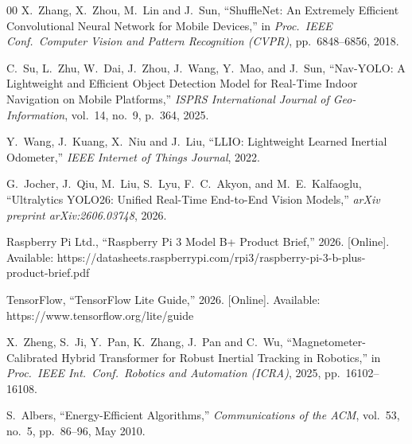 \documentclass[10pt,conference,letterpaper]{IEEEtran}
\begin{document}
\begin{thebibliography}{00}
X.\ Zhang, X.\ Zhou, M.\ Lin and J.\ Sun,
``ShuffleNet: An Extremely Efficient Convolutional Neural Network for
Mobile Devices,''
in \textit{Proc.\ IEEE Conf.\ Computer Vision and Pattern Recognition
(CVPR)}, pp.\ 6848--6856, 2018.


C.~Su, L.~Zhu, W.~Dai, J.~Zhou, J.~Wang, Y.~Mao, and J.~Sun,
``Nav-YOLO: A Lightweight and Efficient Object Detection Model for
Real-Time Indoor Navigation on Mobile Platforms,''
\textit{ISPRS International Journal of Geo-Information}, vol.~14,
no.~9, p.~364, 2025.

Y.~Wang, J.~Kuang, X.~Niu and J.~Liu,
``LLIO: Lightweight Learned Inertial Odometer,''
\textit{IEEE Internet of Things Journal}, 2022.


G.\ Jocher, J.\ Qiu, M.\ Liu, S.\ Lyu, F.\ C.\ Akyon, and M.\ E.\ Kalfaoglu,
``Ultralytics YOLO26: Unified Real-Time End-to-End Vision Models,''
\textit{arXiv preprint arXiv:2606.03748}, 2026.

Raspberry Pi Ltd.,
``Raspberry Pi 3 Model B+ Product Brief,'' 2026. [Online]. Available:
https://datasheets.raspberrypi.com/rpi3/raspberry-pi-3-b-plus-product-brief.pdf

TensorFlow,
``TensorFlow Lite Guide,'' 2026. [Online]. Available:
https://www.tensorflow.org/lite/guide

X.~Zheng, S.~Ji, Y.~Pan, K.~Zhang, J.~Pan and C.~Wu,
``Magnetometer-Calibrated Hybrid Transformer for Robust Inertial
Tracking in Robotics,''
in \textit{Proc.\ IEEE Int.\ Conf.\ Robotics and Automation (ICRA)},
2025, pp.~16102--16108.

S.~Albers,
``Energy-Efficient Algorithms,''
\textit{Communications of the ACM}, vol.~53, no.~5,
pp.~86--96, May 2010.

\end{thebibliography}
\end{document}
